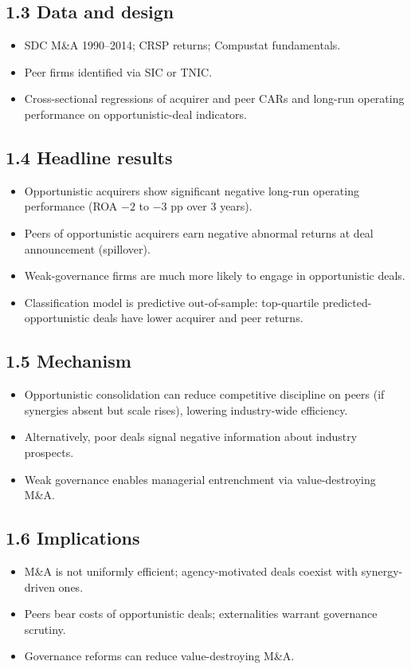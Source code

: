 \documentclass[11pt]{article}
\begin{document}
\subsection*{1.3 Data and design}
\begin{itemize}
\item SDC M\&A 1990--2014; CRSP returns; Compustat fundamentals.
\item Peer firms identified via SIC or TNIC.
\item Cross-sectional regressions of acquirer and peer CARs and long-run operating performance on opportunistic-deal indicators.
\end{itemize}

\subsection*{1.4 Headline results}
\begin{itemize}
\item Opportunistic acquirers show significant negative long-run operating performance (ROA $-2$ to $-3$ pp over 3 years).
\item Peers of opportunistic acquirers earn negative abnormal returns at deal announcement (spillover).
\item Weak-governance firms are much more likely to engage in opportunistic deals.
\item Classification model is predictive out-of-sample: top-quartile predicted-opportunistic deals have lower acquirer and peer returns.
\end{itemize}

\subsection*{1.5 Mechanism}
\begin{itemize}
\item Opportunistic consolidation can reduce competitive discipline on peers (if synergies absent but scale rises), lowering industry-wide efficiency.
\item Alternatively, poor deals signal negative information about industry prospects.
\item Weak governance enables managerial entrenchment via value-destroying M\&A.
\end{itemize}

\subsection*{1.6 Implications}
\begin{itemize}
\item M\&A is not uniformly efficient; agency-motivated deals coexist with synergy-driven ones.
\item Peers bear costs of opportunistic deals; externalities warrant governance scrutiny.
\item Governance reforms can reduce value-destroying M\&A.
\end{itemize}
\end{document}
